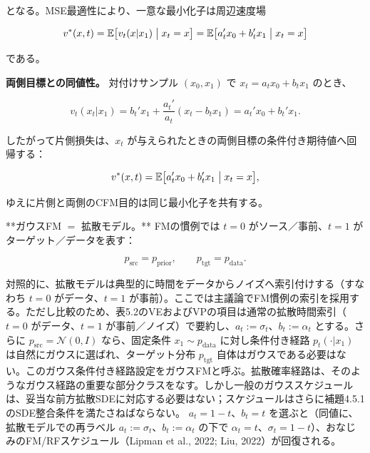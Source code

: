 となる。MSE最適性により、一意な最小化子は周辺速度場

\[
v^*(x,t)=\mathbb{E}\bigl[v_t(x|x_1)\bigm|x_t=x\bigr]=\mathbb{E}\bigl[a_t'x_0+b_t'x_1\bigm|x_t=x\bigr]
\]


である。

\textbf{両側目標との同値性。} 対付けサンプル $(x_0,x_1)$ で $x_t=a_t x_0+b_t x_1$ のとき、

\[
v_t(x_t|x_1)=b_t'x_1+\frac{a_t'}{a_t}(x_t-b_t x_1)=a_t'x_0+b_t'x_1.
\]


したがって片側損失は、$x_t$ が与えられたときの両側目標の条件付き期待値へ回帰する：

\[
v^*(x,t)=\mathbb{E}\bigl[a_t'x_0+b_t'x_1\bigm|x_t=x\bigr],
\]


ゆえに片側と両側のCFM目的は同じ最小化子を共有する。

**ガウスFM $=$ 拡散モデル。** FMの慣例では $t=0$ がソース／事前、$t=1$ がターゲット／データを表す：

\[
p_{\mathrm{src}}=p_{\mathrm{prior}},\qquad p_{\mathrm{tgt}}=p_{\mathrm{data}}.
\]


対照的に、拡散モデルは典型的に時間をデータからノイズへ索引付けする（すなわち $t=0$ がデータ、$t=1$ が事前）。ここでは主議論でFM慣例の索引を採用する。ただし比較のため、表5.2のVEおよびVPの項目は通常の拡散時間索引（$t=0$ がデータ、$t=1$ が事前／ノイズ）で要約し、$a_t:=\sigma_t$、$b_t:=\alpha_t$ とする。さらに $p_{\mathrm{src}}=\mathcal{N}(0,I)$ なら、固定条件 $x_1\sim p_{\mathrm{data}}$ に対し条件付き経路 $p_t(\cdot|x_1)$ は自然にガウスに選ばれ、ターゲット分布 $p_{\mathrm{tgt}}$ 自体はガウスである必要はない。このガウス条件付き経路設定をガウスFMと呼ぶ。拡散確率経路は、そのようなガウス経路の重要な部分クラスをなす。しかし一般のガウススケジュールは、妥当な前方拡散SDEに対応する必要はない；スケジュールはさらに補題4.5.1のSDE整合条件を満たさねばならない。
$a_t=1-t$、$b_t=t$ を選ぶと（同値に、拡散モデルでの再ラベル $a_t:=\sigma_t$、$b_t:=\alpha_t$ の下で $\alpha_t=t$、$\sigma_t=1-t$）、おなじみのFM/RFスケジュール（Lipman et al., 2022; Liu, 2022）が回復される。



